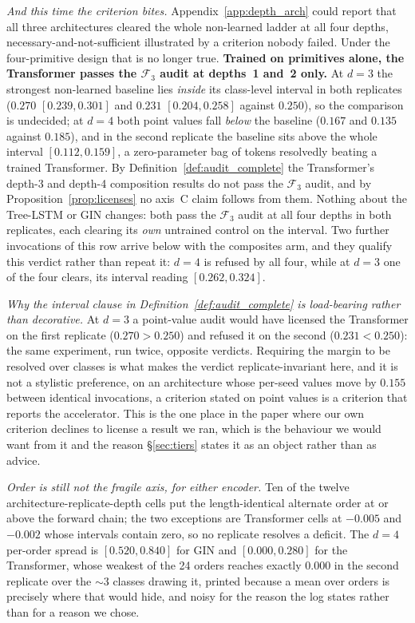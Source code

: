 \emph{And this time the criterion bites.} Appendix~\ref{app:depth_arch} could report that all three architectures cleared the whole non-learned ladder at all four depths, necessary-and-not-sufficient illustrated by a criterion nobody failed. Under the four-primitive design that is no longer true. \textbf{Trained on primitives alone, the Transformer passes the $\mathcal{F}_3$ audit at depths~1 and~2 only.} At $d{=}3$ the strongest non-learned baseline lies \emph{inside} its class-level interval in both replicates ($0.270$ $[0.239,0.301]$ and $0.231$ $[0.204,0.258]$ against $0.250$), so the comparison is undecided; at $d{=}4$ both point values fall \emph{below} the baseline ($0.167$ and $0.135$ against $0.185$), and in the second replicate the baseline sits above the whole interval $[0.112,0.159]$, a zero-parameter bag of tokens resolvedly beating a trained Transformer. By Definition~\ref{def:audit_complete} the Transformer's depth-3 and depth-4 composition results do not pass the $\mathcal{F}_3$ audit, and by Proposition~\ref{prop:licenses} no axis~C claim follows from them. Nothing about the Tree-LSTM or GIN changes: both pass the $\mathcal{F}_3$ audit at all four depths in both replicates, each clearing its \emph{own} untrained control on the interval. Two further invocations of this row arrive below with the composites arm, and they qualify this verdict rather than repeat it: $d{=}4$ is refused by all four, while at $d{=}3$ one of the four clears, its interval reading $[0.262,0.324]$.

\emph{Why the interval clause in Definition~\ref{def:audit_complete} is load-bearing rather than decorative.} At $d{=}3$ a point-value audit would have licensed the Transformer on the first replicate ($0.270 > 0.250$) and refused it on the second ($0.231 < 0.250$): the same experiment, run twice, opposite verdicts. Requiring the margin to be resolved over classes is what makes the verdict replicate-invariant here, and it is not a stylistic preference, on an architecture whose per-seed values move by $0.155$ between identical invocations, a criterion stated on point values is a criterion that reports the accelerator. This is the one place in the paper where our own criterion declines to license a result we ran, which is the behaviour we would want from it and the reason \S\ref{sec:tiers} states it as an object rather than as advice.

\emph{Order is still not the fragile axis, for either encoder.} Ten of the twelve architecture-replicate-depth cells put the length-identical alternate order at or above the forward chain; the two exceptions are Transformer cells at $-0.005$ and $-0.002$ whose intervals contain zero, so no replicate resolves a deficit. The $d{=}4$ per-order spread is $[0.520,0.840]$ for GIN and $[0.000,0.280]$ for the Transformer, whose weakest of the 24 orders reaches exactly $0.000$ in the second replicate over the ${\sim}3$ classes drawing it, printed because a mean over orders is precisely where that would hide, and noisy for the reason the log states rather than for a reason we chose.


